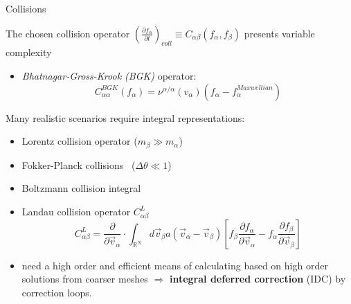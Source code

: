 \documentclass{beamer}
\begin{document}
\begin{frame}{Collisions}

The chosen collision operator $\left(\frac{\partial f_{\alpha}}{\partial t}\right)_{coll} \equiv C_{\alpha\beta}(f_{\alpha},f_{\beta})$ presents variable complexity
    \begin{itemize}   
    \item \emph{Bhatnagar-Gross-Krook (BGK)} operator:
$$C_{\alpha\alpha}^{BGK} (f_{\alpha}) = \nu^{\alpha / \alpha} (v_{\alpha}) (f_{\alpha} - f_{\alpha}^{Maxwellian})$$
    \end{itemize} 
Many realistic scenarios require integral representations:
    \begin{itemize}
    \item Lorentz collision operator ($m_{\beta} \gg m_{\alpha}$)
    \item Fokker-Planck collisions \,\,\,($\Delta\theta \ll 1$)
    \item Boltzmann collision integral
    \item Landau collision operator $C_{\alpha\beta}^L$
 $$C_{\alpha\beta}^L = \frac{\partial}{\partial\vec{v}_{\alpha}}\cdot \int_{\mathbb{R}^N} d\vec{v}_{\beta}a(\vec{v}_{\alpha} - \vec{v}_{\beta})[f_{\beta}\frac{\partial f_{\alpha}}{\partial \vec{v}_{\alpha}}- f_{\alpha}\frac{\partial f_{\beta}}{\partial \vec{v}_{\beta}}]$$ 
    \item need a high order and efficient means of calculating based on high order solutions from coarser meshes $\Rightarrow$ \textbf{integral deferred correction} (IDC) by correction loops.

\end{itemize}

\end{frame}

  

\end{document}
